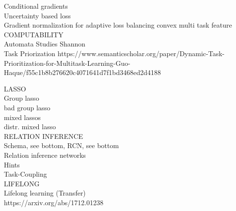 Conditional gradients\\
Uncertainty based loss\\
Gradient normalization for adaptive loss balancing
convex multi task feature\\

COMPUTABILITY\\
Automata Studies Shannon\\
Task Priorization
https://www.semanticscholar.org/paper/Dynamic-Task-Prioritization-for-Multitask-Learning-Guo-Haque/f55c1b8b276620c4071641d7f1bd3468ed2d4188

LASSO\\
Group lasso\\
bad group lasso \\
mixed lassos\\
distr. mixed lasso\\

RELATION INFERENCE\\
Schema, see bottom, RCN, see bottom\\
Relation inference networks\\
Hints\\
Task-Coupling\\

LIFELONG\\
Lifelong learning (Transfer)\\
https://arxiv.org/abs/1712.01238

